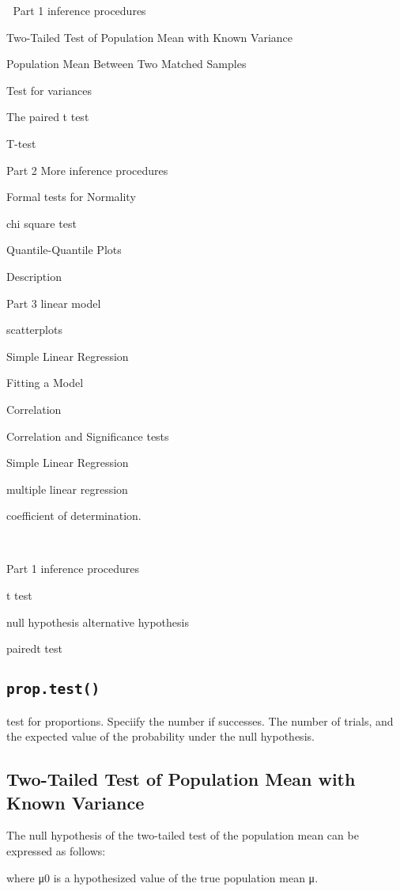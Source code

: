 

Part 1 inference procedures

Two-Tailed Test of Population Mean with Known Variance

Population Mean Between Two Matched Samples

Test for variances

The paired t test

T-test

Part 2 More inference procedures

Formal tests for Normality

chi square test

Quantile-Quantile Plots

Description

Part 3 linear model

scatterplots

Simple Linear Regression

Fitting a Model

Correlation

Correlation and Significance tests

Simple Linear Regression

multiple linear regression

coefficient of determination.




Part 1 inference procedures

t test

null hypothesis alternative hypothesis

pairedt test 
\subsection{ \texttt{prop.test()} }


test for proportions. Speciify the number if successes.  The number of trials, and the expected value of the probability under the null hypothesis.

\subsection{Two-Tailed Test of Population Mean with Known Variance}

The null hypothesis of the two-tailed test of the population mean can be expressed as follows:



where μ0 is a hypothesized value of the true population mean μ.

